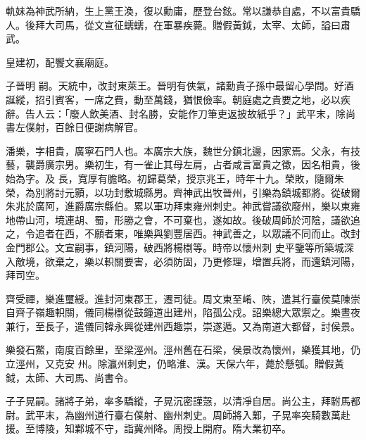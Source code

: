 \begin{pinyinscope}
 軌妹為神武所納，生上黨王渙，復以勳庸，歷登台鉉。常以謙恭自處，不以富貴驕人。後拜大司馬，從文宣征蠕蠕，在軍暴疾薨。贈假黃鉞，太宰、太師，謚曰肅武。



 皇建初，配饗文襄廟庭。



 子晉明
 嗣。天統中，改封東萊王。晉明有俠氣，諸勳貴子孫中最留心學問。好酒誕縱，招引賓客，一席之費，動至萬錢，猶恨儉率。朝庭處之貴要之地，必以疾辭。告人云：「廢人飲美酒、封名勝，安能作刀筆吏返披故紙乎？」武平末，除尚書左僕射，百餘日便謝病解官。



 潘樂，字相貴，廣寧石門人也。本廣宗大族，魏世分鎮北邊，因家焉。父永，有技藝，襲爵廣宗男。樂初生，有一雀止其母左肩，占者咸言富貴之徵，因名相貴，後始為字。及
 長，寬厚有膽略。初歸葛榮，授京兆王，時年十九。榮敗，隨爾朱榮，為別將討元顥，以功封敷城縣男。齊神武出牧晉州，引樂為鎮城都將。從破爾朱兆於廣阿，進爵廣宗縣伯。累以軍功拜東雍州刺史。神武嘗議欲廢州，樂以東雍地帶山河，境連胡、蜀，形勝之會，不可棄也，遂如故。後破周師於河陰，議欲追之，令追者在西，不願者東，唯樂與劉豐居西。神武善之，以眾議不同而止。改封金門郡公。文宣嗣事，鎮河陽，破西將楊檦等。時帝以懷州刺
 史平鑒等所築城深入敵境，欲棄之，樂以軹關要害，必須防固，乃更修理，增置兵將，而還鎮河陽，拜司空。



 齊受禪，樂進璽綬。進封河東郡王，遷司徒。周文東至崤、陜，遣其行臺侯莫陳崇自齊子嶺趣軹關，儀同楊檦從鼓鐘道出建州，陷孤公戍。詔樂總大眾禦之。樂晝夜兼行，至長子，遣儀同韓永興從建州西趣崇，崇遂遁。又為南道大都督，討侯景。



 樂發石鱉，南度百餘里，至梁涇州。涇州舊在石梁，侯景改為懷州，樂獲其地，仍立涇州，又克安
 州。除瀛州刺史，仍略淮、漢。天保六年，薨於懸瓠。贈假黃鉞，太師、大司馬、尚書令。



 子子晃嗣。諸將子弟，率多驕縱，子晃沉密謹愨，以清凈自居。尚公主，拜駙馬都尉。武平末，為幽州道行臺右僕射、幽州刺史。周師將入鄴，子晃率突騎數萬赴援。至博陵，知鄴城不守，詣冀州降。周授上開府。隋大業初卒。



\end{pinyinscope}